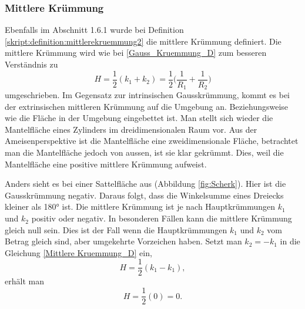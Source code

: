 \begin{refsection}
%
\subsubsection{Mittlere Krümmung} 


Ebenfalls im Abschnitt 1.6.1 wurde bei Definition \ref{skript:definition:mittlerekruemmung2} die mittlere Krümmung definiert. Die mittlere Krümmung wird wie bei \eqref{Gauss_Kruemmung_D} zum besseren Verständnis zu
\begin{equation} \label{Mittlere Kruemmung_D}
H=\frac{1}{2}(k_1+k_2)= \frac{1}{2}\bigg(\frac{1}{R_1}+\frac{1}{R_2}\bigg)
\end{equation}
umgeschrieben.
Im Gegensatz zur intrinsischen Gausskrümmung, kommt es bei der extrinsischen mittleren Krümmung auf die Umgebung an. Beziehungsweise wie die Fläche in der Umgebung eingebettet ist.
Man stellt sich wieder die Mantelfläche eines Zylinders im dreidimensionalen Raum vor.
Aus der Ameisenperspektive ist die Mantelfläche eine zweidimensionale Fläche, betrachtet man die Mantelfläche jedoch von aussen, ist sie klar gekrümmt.
Dies, weil die Mantelfläche eine positive mittlere Krümmung aufweist. 


Anders sieht es bei einer Sattelfläche aus (Abbildung \ref{fig:Scherk}). Hier ist die Gausskrümmung negativ. Daraus folgt, dass die Winkelsumme eines Dreiecks kleiner als 180° ist. Die mittlere Krümmung ist je nach Hauptkrümmungen $k_1$ und $k_2$ positiv oder negativ. In besonderen Fällen kann die mittlere Krümmung gleich null sein. Dies ist der Fall wenn die Hauptkrümmungen $k_1$ und $k_2$ vom Betrag gleich sind, aber umgekehrte Vorzeichen haben. Setzt man $k_2 = - k_1$ in die Gleichung \eqref{Mittlere Kruemmung_D} ein,
\begin{equation}
H=\frac{1}{2}(k_1-k_1),
\end{equation}
erhält man 
\begin{equation}
H=\frac{1}{2}(0)=0.
\end{equation}


\end{refsection}
